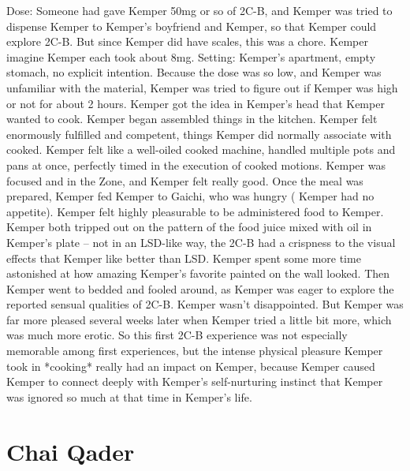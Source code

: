 \documentclass[12pt]{book}
\begin{document}
Dose: Someone had gave Kemper 50mg or so of 2C-B, and Kemper was tried to dispense Kemper to Kemper's boyfriend and Kemper, so that Kemper could explore 2C-B. But since Kemper did have scales, this was a chore. Kemper imagine Kemper each took about 8mg. Setting: Kemper's apartment, empty stomach, no explicit intention. Because the dose was so low, and Kemper was unfamiliar with the material, Kemper was tried to figure out if Kemper was high or not for about 2 hours. Kemper got the idea in Kemper's head that Kemper wanted to cook. Kemper began assembled things in the kitchen. Kemper felt enormously fulfilled and competent, things Kemper did normally associate with cooked. Kemper felt like a well-oiled cooked machine, handled multiple pots and pans at once, perfectly timed in the execution of cooked motions. Kemper was focused and in the Zone, and Kemper felt really good. Once the meal was prepared, Kemper fed Kemper to Gaichi, who was hungry ( Kemper had no appetite). Kemper felt highly pleasurable to be administered food to Kemper. Kemper both tripped out on the pattern of the food juice mixed with oil in Kemper's plate -- not in an LSD-like way, the 2C-B had a crispness to the visual effects that Kemper like better than LSD. Kemper spent some more time astonished at how amazing Kemper's favorite painted on the wall looked. Then Kemper went to bedded and fooled around, as Kemper was eager to explore the reported sensual qualities of 2C-B. Kemper wasn't disappointed. But Kemper was far more pleased several weeks later when Kemper tried a little bit more, which was much more erotic. So this first 2C-B experience was not especially memorable among first experiences, but the intense physical pleasure Kemper took in *cooking* really had an impact on Kemper, because Kemper caused Kemper to connect deeply with Kemper's self-nurturing instinct that Kemper was ignored so much at that time in Kemper's life.



\chapter{Chai Qader}
\end{document}
